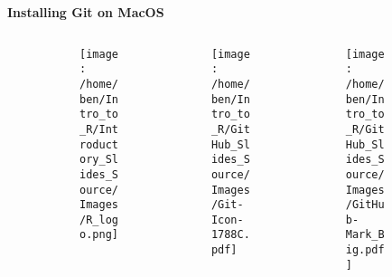\documentclass[xcolor=dvipsnames]{beamer}
\begin{document}





\begin{frame} %
\begin{center}
\textbf{\huge Installing Git on MacOS}\\
\end{center}

\begin{figure}
\begin{columns}

\begin{column}{3.3cm}
\begin{center}
\begin{figure}
\texttt{[image: /home/ben/Intro\_to\_R/Introductory\_Slides\_Source/Images/R\_logo.png]}
\end{figure}
\end{center}
\end{column} 

\begin{column}{3.3cm}
\begin{center}
\begin{figure}
\texttt{[image: /home/ben/Intro\_to\_R/GitHub\_Slides\_Source/Images/Git-Icon-1788C.pdf]}
\end{figure}
\end{center}
\end{column} 

\begin{column}{3.3cm}
\begin{center}
\begin{figure}
\texttt{[image: /home/ben/Intro\_to\_R/GitHub\_Slides\_Source/Images/GitHub-Mark\_Big.pdf]}
\end{figure}
\end{center}
\end{column} 


\end{columns}
\end{figure}
\end{frame}
\end{document}
